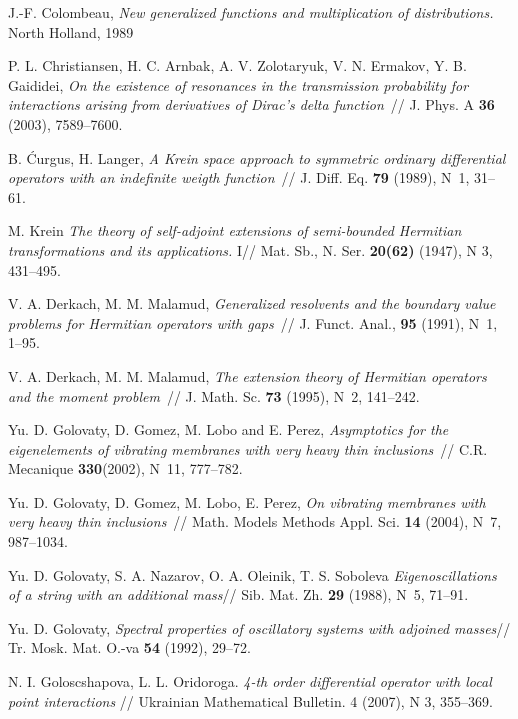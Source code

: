 \documentclass[11pt,english]{amsart}
\begin{document}
\begin{thebibliography}{99}
 J.-F. Colombeau, \textit{New generalized functions and multiplication
of distributions.} North Holland, 1989

P. L. Christiansen, H. C. Arnbak, A. V. Zolotaryuk, V. N. Ermakov, Y. B. Gaididei,
\textit{On the existence of resonances in the transmission probability for interactions
arising from derivatives of Dirac's delta function}~// J. Phys. A \textbf{36} (2003),
7589--7600.

 B. \'{C}urgus, H. Langer,
\textit{A Krein space approach to symmetric ordinary differential operators with
    an indefinite weigth function}~// J. Diff. Eq. \textbf{79} (1989), N~1, 31--61.

M. Krein \textit{The theory of self-adjoint extensions of semi-bounded Hermitian
    transformations and its applications. } I// Mat. Sb., N. Ser. \textbf{20(62)} (1947), N 3, 431--495.

V. A. Derkach, M. M. Malamud, \textit{Generalized resolvents and the boundary value
problems for Hermitian operators with gaps}~// J. Funct. Anal., \textbf{95} (1991), N~1,
1--95.

V. A. Derkach, M. M. Malamud, \textit{ The extension theory of Hermitian operators and the
moment problem}~// J. Math. Sc. \textbf{73} (1995), N~2, 141--242.

Yu. D. Golovaty, D. Gomez, M. Lobo and E. Perez, \textit{Asymptotics for the eigenelements
of vibrating membranes with very heavy thin inclusions}~// C.R. Mecanique
\textbf{330}(2002), N~11, 777--782.

Yu. D. Golovaty, D. Gomez, M. Lobo, E. Perez, \textit{On vibrating membranes with very
heavy thin inclusions}~// Math. Models Methods Appl. Sci. \textbf{14} (2004), N~7,
987--1034.

Yu. D. Golovaty, S. A. Nazarov, O. A. Oleinik, T. S. Soboleva \textit{ Eigenoscillations of a string with an additional mass}// Sib. Mat. Zh. \textbf{29} (1988), N~5, 71--91.

Yu. D. Golovaty,  \textit{Spectral properties of oscillatory systems with adjoined masses}// Tr. Mosk. Mat. O.-va \textbf{54} (1992), 29--72.

N. I. Goloscshapova, L. L. Oridoroga.\textit{ 4-th order differential operator
with local point interactions }// Ukrainian Mathematical Bulletin. 4 (2007),
N 3, 355--369.


\end{thebibliography}
\end{document}
